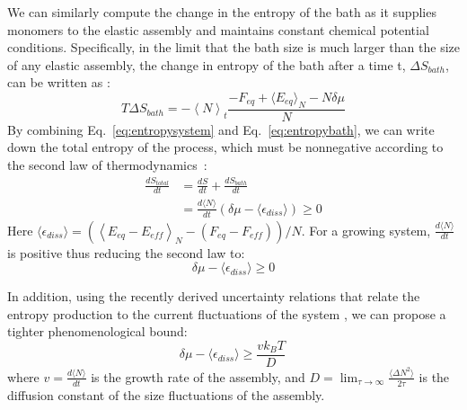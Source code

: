 \documentclass[amsmath,preprintnumbers,10pt,nofootinbib,prl,twocolumn]{revtex4-1}
\begin{document}
We can similarly compute the change in the entropy of the bath as it supplies monomers to the elastic assembly and maintains constant chemical potential conditions. Specifically, in the limit that the bath size is much larger than the size of any elastic assembly, the change in entropy of the bath after a time t, $\Delta S_{bath}$, can be written as :
\begin{equation}
\label{eq:entropybath}
 T\Delta S_{bath}=-\left\langle N \right\rangle_t \frac{-F_{\mathit{eq}} + \langle E_{\mathit{eq}} \rangle _N-N\delta\mu}{N}
\end{equation}
By combining Eq.~\ref{eq:entropysystem} and Eq.~\ref{eq:entropybath}, we can write down the total entropy of the process, which must be nonnegative according to the second law of thermodynamics~\cite{Esposito2012}:
\begin{equation}
\begin{split}
\label{eq:entropytotal}
\frac{dS_{total}}{dt}&=\frac{dS}{dt} +\frac{dS_\mathit{bath}}{dt}\\
&= \frac{d\langle N\rangle}{dt}\left ( \delta\mu-\langle\epsilon_{diss}\rangle \right) \geq 0
\end{split}
\end{equation}
Here $\langle\epsilon_{diss}\rangle=\left (\left\langle E_{eq}-E_{\mathit{eff}}\right\rangle _N-\left ( F_{eq}-F_{\mathit{eff}}\right )\right )/N$. For a growing system, $\frac{d\langle N \rangle}{dt}$ is positive thus reducing the second law to:
\begin{equation}
\label{eq:firstbound}
\delta\mu-\langle\epsilon_{diss}\rangle\geq0
\end{equation}

In addition, using the recently derived uncertainty relations that relate the entropy production to the current fluctuations of the system \cite{Barato2015, Gingrich2016,Nguyen2016}, we can propose a tighter phenomenological bound:
\begin{equation}
\label{eq:secondbound}
\delta\mu-\langle\epsilon_{diss}\rangle\geq\frac{v k_B T}{D}\, 
\end{equation}
where $v=\frac{d\langle N\rangle}{dt}$ is the growth rate of the assembly, and $D=\lim_{\tau\to\infty}\frac{\langle\Delta N^2\rangle}{2\tau}$  is the diffusion constant of the size fluctuations of the assembly.
\end{document}
